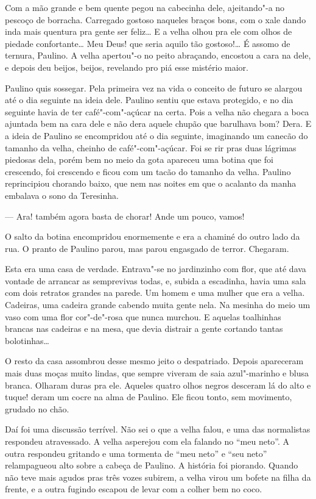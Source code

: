 \begin{linenumbers}
Com a mão grande e bem quente pegou na cabecinha dele, ajeitando"-a no
pescoço de borracha. Carregado gostoso naqueles braços bons, com o xale
dando inda mais quentura pra gente ser feliz\ldots{} E a velha olhou pra ele
com olhos de piedade confortante\ldots{} Meu Deus! que seria aquilo tão
gostoso!\ldots{} É assomo de ternura, Paulino. A velha apertou"-o no peito
abraçando, encostou a cara na dele, e depois deu beijos, beijos,
revelando pro piá esse mistério maior.

Paulino quis sossegar. Pela primeira vez na vida o conceito de futuro se
alargou até o dia seguinte na ideia dele. Paulino sentiu que estava
protegido, e no dia seguinte havia de ter café"-com"-açúcar na certa. Pois
a velha não chegara a boca ajuntada bem na cara dele e não dera aquele
chupão que barulhava bom? Dera. E a ideia de Paulino se encompridou até
o dia seguinte, imaginando um canecão do tamanho da velha, cheinho de
café"-com"-açúcar. Foi se rir pras duas lágrimas piedosas dela, porém bem
no meio da gota apareceu uma botina que foi crescendo, foi crescendo e
ficou com um tacão do tamanho da velha. Paulino reprincipiou chorando
baixo, que nem nas noites em que o acalanto da manha embalava o sono da
Teresinha.

--- Ara! também agora basta de chorar! Ande um pouco, vamos!

O salto da botina encompridou enormemente e era a chaminé do outro lado
da rua. O pranto de Paulino parou, mas parou engasgado de terror.
Chegaram. 

Esta era uma casa de verdade. Entrava"-se no jardinzinho com flor, que
até dava vontade de arrancar as semprevivas todas, e, subida a
escadinha, havia uma sala com dois retratos grandes na parede. Um homem
e uma mulher que era a velha. Cadeiras, uma cadeira grande cabendo muita
gente nela. Na mesinha do meio um vaso com uma flor cor"-de"-rosa que
nunca murchou. E aquelas toalhinhas brancas nas cadeiras e na mesa, que
devia distrair a gente cortando tantas bolotinhas\ldots{}

O resto da casa assombrou desse mesmo jeito o despatriado. Depois
apareceram mais duas moças muito lindas, que sempre viveram de saia
azul"-marinho e blusa branca. Olharam duras pra ele. Aqueles quatro olhos
negros desceram lá do alto e tuque! deram um cocre na alma de Paulino.
Ele ficou tonto, sem movimento, grudado no chão.

Daí foi uma discussão terrível. Não sei o que a velha falou, e uma das
normalistas respondeu atravessado. A velha asperejou com ela falando no
``meu neto''. A outra respondeu gritando e uma tormenta de ``meu neto''
e ``seu neto'' relampagueou alto sobre a cabeça de Paulino. A história
foi piorando. Quando não teve mais agudos pras três vozes subirem, a
velha virou um bofete na filha da frente, e a outra fugindo escapou de
levar com a colher bem no coco.


\end{linenumbers}
